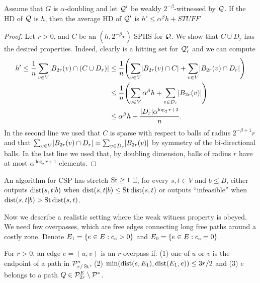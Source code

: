 \documentclass[letterpaper,11pt]{article}
\begin{document}
\begin{proposition}
Assume that $G$ is $\alpha$-doubling and let $\mathcal{Q}'$ be weakly $2^{-\beta}$-witnessed by $\mathcal{Q}$.
If the HD of $\mathcal{Q}$ is $h$, then the average HD of $\mathcal{Q}'$ is $h'\leq \alpha^{\beta}h+STUFF$
\end{proposition}
\begin{proof}
Let $r>0$, and $C$ be an $(h,2^{-\beta}r)$-SPHS for $\mathcal{Q}$.
We show that $C\cup D_r$ has the desired properties.
Indeed, clearly is a hitting set for $\mathcal{Q}'_r$ and we can compute
\begin{align*}
h'\leq \frac{1}{n}\sum_{v\in V} \abs{B_{2r}(v)\cap (C\cup D_r)}
&\leq \frac{1}{n}\prn*{\sum_{v\in V} \abs{B_{2r}(v)\cap C}+\sum_{v\in V} \abs{B_{2r}(v)\cap D_r}}\\
&\leq \frac{1}{n}\prn*{\sum_{v\in V} \alpha^\beta h+\sum_{v\in D_r} \abs{B_{2r}(v)}}\\
&\leq \alpha^\beta h + \frac{\abs{D_r}\alpha^{\log_2r+2}}{n}.
\end{align*}
In the second line we used that $C$ is sparse with respect to balls of radius $2^{-\beta+1}r$ and that $\sum_{v\in V} \lvert B_{2r}(v)\cap D_r\rvert=\sum_{v\in D_r} \lvert B_{2r}(v)\rvert$ by symmetry of the bi-directional balls.
In the last line we used that, by doubling dimension, balls of radius $r$ have at most $\alpha^{\log_2r+1}$ elements.
\end{proof}

\begin{definition}[Stretch]
An algorithm for CSP has stretch $\operatorname{St}\geq 1$ if, for every $s,t\in V$ and $b\leq B$, either outputs $\mbox{dist}(s,t|b)$ when $\mbox{dist}(s,t|b)\leq \operatorname{St}\mbox{dist}(s,t)$ or outputs ``infeasible'' when $\mbox{dist}(s,t|b)>\operatorname{St}\mbox{dist}(s,t)$.
\end{definition}


Now we describe a realistic setting where the weak witness property is obeyed.
We need few overpasses, which are free edges connecting long free paths around a costly zone.
Denote $E_1=\{e\in E:c_e>0\}$ and $E_0=\{e\in E:c_e=0\}$.

\begin{definition}[Overpass]
For $r>0$, an edge $e=(u,v)$ is an $r$-overpass if: (1) one of $u$ or $v$ is the endpoint of a path in $\mathcal{P}^*_{r/\operatorname{St}}$, (2) $\min(\mbox{dist}(e,E_1),\mbox{dist}(E_1,e))\leq 3r/2$ and (3) $e$ belongs to a path $Q\in\mathcal{P}^E_{2r}\setminus\mathcal{P}^*$.
\end{definition} 
\end{document}
